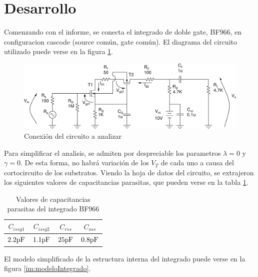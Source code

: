 \section{Desarrollo}
Comenzando con el informe, se conecta el integrado de doble gate, BF966, en configuracion cascode (source común, gate común). El diagrama del circuito utilizado puede verse en la figura \ref{im:circuito}.

\begin{figure}[ht]
	\centering
	\includegraphics[scale=0.5]{../img/circuitoTL3.pdf}
	\caption{Conexión del circuito a analizar}
	\label{im:circuito}
\end{figure}

Para simplificar el analisis, se admiten por despreciable los parametros $\lambda = 0$ y $\gamma = 0$. De esta forma, no habrá variación de los $V_T$ de cada uno a causa del cortocircuito de los substratos. Viendo la hoja de datos del circuito, se extrajeron los siguientes valores de capacitancias parasitas, que pueden verse en la tabla \ref{ta:capacitanciasParasitas}.

\begin{table}[ht]
\begin{center}
\begin{tabular}{|c|c|c|c|}
\hline 
$C_{issg1}$ & $C_{issg2}$ & $C_{rss}$ & $C_{oss}$ \\ 
\hline 
$2.2\mbox{pF}$ & $1.1\mbox{pF}$ & $25\mbox{pF}$ & $0.8\mbox{pF}$ \\ 
\hline 
\end{tabular}
\end{center} 
\caption{Valores de capacitancias parasitas del integrado BF966}
\label{ta:capacitanciasParasitas}
\end{table}

El modelo simplificado de la estructura interna del integrado puede verse en la figura \ref{im:modeloIntegrado}.

